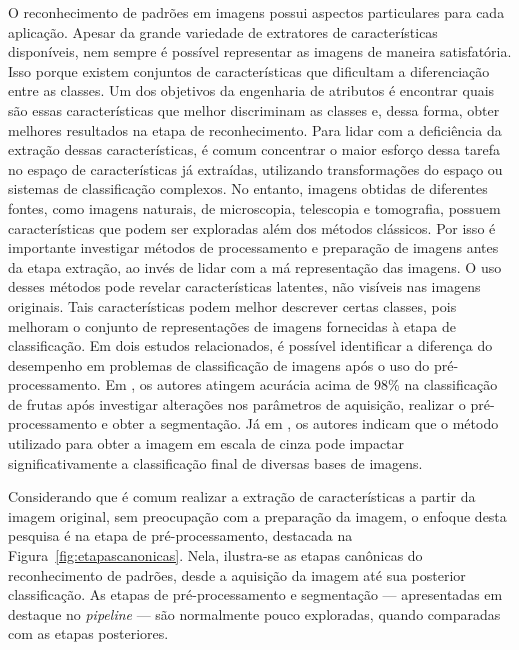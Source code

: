 O reconhecimento de padrões em imagens possui aspectos particulares para cada aplicação. Apesar da grande variedade de extratores de características disponíveis, nem sempre é possível representar as imagens de maneira satisfatória. Isso porque existem conjuntos de características que dificultam a diferenciação entre as classes. Um dos objetivos da engenharia de atributos é encontrar quais são essas características que melhor discriminam as classes e, dessa forma, obter melhores resultados na etapa de reconhecimento. Para lidar com a deficiência da extração dessas características, é comum concentrar o maior esforço dessa tarefa no espaço de características já extraídas, utilizando transformações do espaço ou sistemas de classificação complexos. No entanto, imagens obtidas de diferentes fontes, como imagens naturais, de microscopia, telescopia e tomografia, possuem características que podem ser exploradas além dos métodos clássicos. Por isso é importante investigar métodos de processamento e preparação de imagens antes da etapa extração, ao invés de lidar com a má representação das imagens. O uso desses métodos pode revelar características latentes, não visíveis nas imagens originais. Tais características podem melhor descrever certas classes, pois melhoram o conjunto de representações de imagens fornecidas à etapa de classificação. Em dois estudos relacionados, é possível identificar a diferença do desempenho em problemas de classificação de imagens após o uso do pré-processamento. Em , os autores atingem acurácia acima de 98\% na classificação de frutas após investigar alterações nos parâmetros de aquisição, realizar o pré-processamento e obter a segmentação. Já em , os autores indicam que o método utilizado para obter a imagem em escala de cinza pode impactar significativamente a classificação final de diversas bases de imagens.

Considerando que é comum realizar a extração de características a partir da imagem original, sem preocupação com a preparação da imagem, o enfoque desta pesquisa é na etapa de pré-processamento, destacada na Figura~\ref{fig:etapascanonicas}. Nela, ilustra-se as etapas canônicas do reconhecimento de padrões, desde a aquisição da imagem até sua posterior classificação. As etapas de pré-processamento e segmentação --- apresentadas em destaque no \textit{pipeline} --- são normalmente pouco exploradas, quando comparadas com as etapas posteriores.

